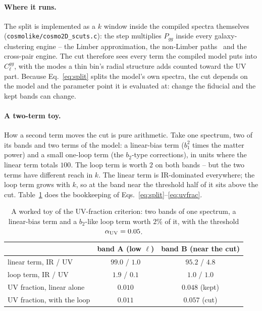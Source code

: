 \documentclass[11pt]{article}
\newcommand{\auv}{\alpha_{\rm UV}}
\newcommand{\us}{\_\allowbreak}
\begin{document}
\paragraph{Where it runs.}
The split is implemented as a $k$ window inside the compiled
spectra themselves
(\texttt{cosmolike/cosmo2D\us scuts.c}): the step multiplies
$P_{gg}$ inside every galaxy-clustering engine -- the Limber
approximation, the non-Limber paths~\cite{FangKEM2020} and the
cross-pair engine.  The cut therefore sees every term the compiled
model puts into $C_\ell^{gg}$, with the modes a thin bin's radial
structure adds counted toward the UV part.  Because
Eq.~\eqref{eq:split} splits the model's own spectra, the cut depends
on the model and the parameter point it is evaluated at: change the
fiducial and the kept bands can change.

\paragraph{A two-term toy.}
How a second term moves the cut is pure arithmetic.  Take one
spectrum, two of its bands and two terms of the model: a linear-bias
term ($b_1^2$ times the matter power) and a small one-loop term (the
$b_2$-type corrections), in units where the linear term totals
$100$.  The loop term is worth $2$ on both bands -- but the two terms
have different reach in $k$.  The linear term is IR-dominated
everywhere; the loop term grows with $k$, so at the band near the
threshold half of it sits above the cut.
Table~\ref{tab:toy} does the bookkeeping of
Eqs.~\eqref{eq:split}--\eqref{eq:uvfrac}.

\begin{table}[tbp]
  \centering
  \begin{tabular}{lcc}
    \hline
    & band A (low $\ell$) & band B (near the cut) \\
    \hline
    linear term, IR / UV        & $99.0$ / $1.0$ & $95.2$ / $4.8$ \\
    loop term, IR / UV          & $1.9$ / $0.1$  & $1.0$ / $1.0$  \\
    \hline
    UV fraction, linear alone   & $0.010$        & $0.048$ (kept) \\
    UV fraction, with the loop  & $0.011$        & $0.057$ (cut)  \\
    \hline
  \end{tabular}
  \caption{A worked toy of the UV-fraction criterion: two bands of
    one spectrum, a linear-bias term and a $b_2$-like loop term worth
    $2\%$ of it, with the threshold $\auv = 0.05$.}
  \label{tab:toy}
\end{table}
\end{document}
